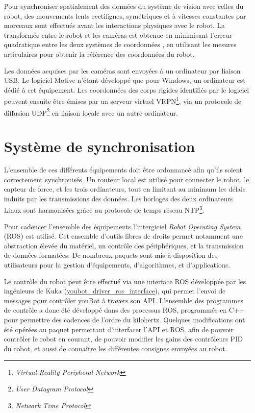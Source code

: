 \begin{appendices}
	Pour synchroniser spatialement des données du système de vision avec celles du robot, des mouvements lents rectilignes, symétriques et à vitesses constantes par morceaux sont effectués avant les interactions physiques avec le robot. La transformée entre le robot et les caméras est obtenue en minimisant l'erreur quadratique entre les deux systèmes de coordonnées \parencite{horn_closed-form_1987}, en utilisant les mesures articulaires pour obtenir la référence des coordonnées du robot.
	
	Les données acquises par les caméras sont envoyées à un ordinateur par liaison USB. Le logiciel Motive n'étant développé que pour Windows, un ordinateur est dédié à cet équipement. Les coordonnées des corps rigides identifiés par le logiciel peuvent ensuite être émises par un serveur virtuel VRPN\footnote{\textit{Virtual-Reality Peripheral Network}}, via un protocole de diffusion UDP\footnote{\textit{User Datagram Protocol}} en liaison locale avec un autre ordinateur.
	
	\section{Système de synchronisation} \label{app_apparatus_sec_synchro}%
	
	L'ensemble de ces différents équipements doit être ordonnancé afin qu'ils soient correctement synchronisés. Un routeur local est utilisé pour connecter le robot, le capteur de force, et les trois ordinateurs, tout en limitant au minimum les délais induits par les transmissions des données. Les horloges des deux ordinateurs Linux sont harmonisées grâce au protocole de temps réseau NTP\footnote{\textit{Network Time Protocol}}.
	
	
	Pour cadencer l'ensemble des équipements l'intergiciel \textit{Robot Operating System} (ROS) est utilisé. Cet ensemble d'outils libres de droits permet notamment une abstraction élevée du matériel, un contrôle des périphériques, et la transmission de données formatées. De nombreux paquets sont mis à disposition des utilisateurs pour la gestion d'équipements, d'algorithmes, et d'applications.
	
	Le contrôle du robot peut être effectué via une interface ROS développée par les ingénieurs de Kuka (\href{https://github.com/youbot/youbot_driver_ros_interface}{youbot\_driver\_ros\_interface}), qui permet l'envoi de messages pour contrôler youBot à travers son API. L'ensemble des programmes de contrôle a donc été développé dans des processus ROS, programmés en C++ pour permettre des cadences de l'ordre du kilohertz. Quelques modifications ont été opérées au paquet permettant d'interfacer l'API et ROS, afin de pouvoir contrôler le robot en courant, de pouvoir modifier les gains des contrôleurs PID du robot, et aussi de connaître les différentes consignes envoyées au robot.
	

\end{appendices}
